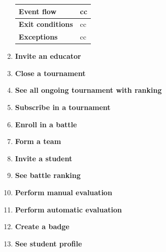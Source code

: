 \begin{enumerate}[label=\textbf{UC.\arabic*}]
\begin{table}[H]
\begin{tabular}{|m{3.2cm}|m{9.8cm}|}
                    \hline
                    \textbf{Event flow}  & cc \\ 
                    \hline
                    \textbf{Exit conditions}  & cc \\
                    \hline
                    \textbf{Exceptions}  & cc \\
                    \hline 
                \end{tabular}
        \end{table}
        \item {} \textbf{Invite an educator}
        \item {} \textbf{Close a tournament}
        \item {} \textbf{See all ongoing tournament with ranking}
        \item {} \textbf{Subscribe in a tournament}
        \item {} \textbf{Enroll in a battle}
        \item {} \textbf{Form a team}
        \item {} \textbf{Invite a student}
        \item {} \textbf{See battle ranking}
        \item {} \textbf{Perform manual evaluation}
        \item {} \textbf{Perform automatic evaluation}
        \item {} \textbf{Create a badge}
        \item {} \textbf{See student profile}
    \end{enumerate}
    

